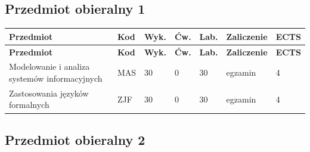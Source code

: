 \documentclass[12pt,a4paper]{article}
\newcommand{\thdrule}{\noalign{\global\setlength{\extrarowheight}{0pt}}}
\newcommand{\thdend}{\noalign{\global\setlength{\extrarowheight}{4pt}}}
\begin{document}
\subsection*{Przedmiot obieralny 1}

{\scriptsize
\begin{longtable}{m{5.5cm}m{0.8cm}m{1cm}m{1cm}m{1cm}m{1.7cm}m{0.7cm}}
\thdrule\toprule
\rowcolor{pjatkRed}
{\color{white}\footnotesize\textbf{\vphantom{Ag}Przedmiot}} & {\color{white}\footnotesize\textbf{\vphantom{Ag}Kod}} & {\color{white}\footnotesize\textbf{\vphantom{Ag}Wyk.}} & {\color{white}\footnotesize\textbf{\vphantom{Ag}Ćw.}} & {\color{white}\footnotesize\textbf{\vphantom{Ag}Lab.}} & {\color{white}\footnotesize\textbf{\vphantom{Ag}Zaliczenie}} & {\color{white}\footnotesize\textbf{\vphantom{Ag}ECTS}} \\
\midrule\thdend
\endfirsthead
\thdrule\toprule
\rowcolor{pjatkRed}
{\color{white}\footnotesize\textbf{\vphantom{Ag}Przedmiot}} & {\color{white}\footnotesize\textbf{\vphantom{Ag}Kod}} & {\color{white}\footnotesize\textbf{\vphantom{Ag}Wyk.}} & {\color{white}\footnotesize\textbf{\vphantom{Ag}Ćw.}} & {\color{white}\footnotesize\textbf{\vphantom{Ag}Lab.}} & {\color{white}\footnotesize\textbf{\vphantom{Ag}Zaliczenie}} & {\color{white}\footnotesize\textbf{\vphantom{Ag}ECTS}} \\
\midrule\thdend
\endhead
\rowcolor{tableRowLight} Modelowanie i analiza systemów informacyjnych & MAS & 30 & 0 & 30 & {\scriptsize egzamin} & 4 \\
\rowcolor{tableRowAlt} Zastosowania języków formalnych & ZJF & 30 & 0 & 30 & {\scriptsize egzamin} & 4 \\
\bottomrule
\end{longtable}}

\subsection*{Przedmiot obieralny 2}
\end{document}
